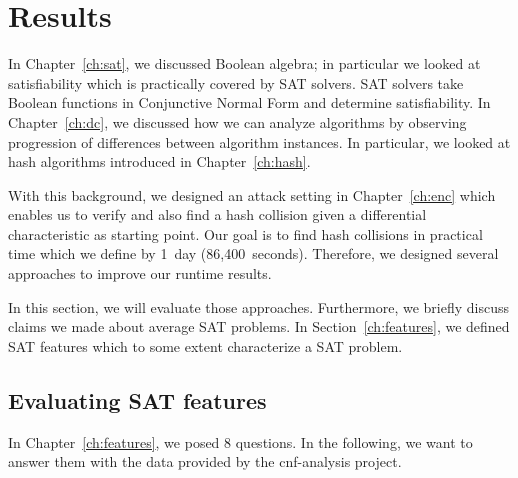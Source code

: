 \renewcommand*\chappic{img/megosat.pdf}
\renewcommand*\chapquote{}
\renewcommand*\chapquotesrc{}
\chapter{Results}
\label{ch:results}
%
In Chapter~\ref{ch:sat}, we discussed Boolean algebra; in particular we looked at
satisfiability which is practically covered by SAT solvers. SAT solvers take
Boolean functions in Conjunctive Normal Form and determine satisfiability.
In Chapter~\ref{ch:dc}, we discussed how we can analyze algorithms by observing
progression of differences between algorithm instances. In particular,
we looked at hash algorithms introduced in Chapter~\ref{ch:hash}.

With this background, we designed an attack setting in Chapter~\ref{ch:enc}
which enables us to verify and also find a hash collision given a differential
characteristic as starting point. Our goal is to find hash collisions
in practical time which we define by 1~day (86,400~seconds).
Therefore, we designed several approaches to improve our runtime results.

In this section, we will evaluate those approaches. Furthermore, we briefly
discuss claims we made about average SAT problems. In Section~\ref{ch:features},
we defined SAT features which to some extent characterize a SAT problem.

\section{Evaluating SAT features}
\label{sec:results-features}
%
In Chapter~\ref{ch:features}, we posed 8 questions.
In the following, we want to answer them with the data
provided by the cnf-analysis project.

